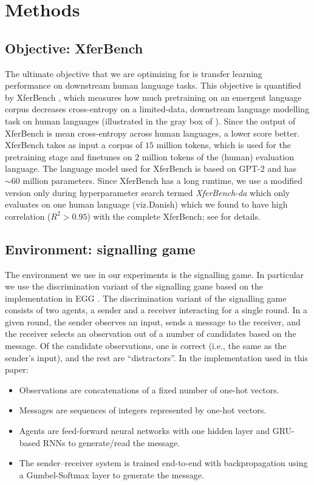 \section{Methods}
\unskip\label{hpo:sec:methods}
\subsection{Objective: XferBench}

The ultimate objective that we are optimizing for is transfer learning performance on downstream human language tasks.
This objective is quantified by XferBench \citep[MIT license]{boldt-mortensen-2024-xferbench}, which measures how much pretraining on an emergent language corpus decreases cross-entropy on a limited-data, downstream language modelling task on human languages (illustrated in the gray box of ).
Since the output of XferBench is mean cross-entropy across human languages, a lower score better.
XferBench takes as input a corpus of $15$ million tokens, which is used for the pretraining stage and finetunes on $2$ million tokens of the (human) evaluation language.
The language model used for XferBench is based on GPT-2 \citep{radford2019language} and has ${\sim}60$ million parameters.
Since XferBench has a long runtime, we use a modified version only during hyperparameter search termed \emph{XferBench-da} which only evaluates on one human language (viz.\@ Danish) which we found to have high correlation ($R^2>0.95$) with the complete XferBench; see  for details.

\subsection{Environment: signalling game}
The environment we use in our experiments is the signalling game.
In particular we use the discrimination variant of the signalling game based on the implementation in EGG \citep[\url{https://github.com/facebookresearch/EGG}, MIT license]{egg}.
The discrimination variant of the signalling game consists of two agents, a sender and a receiver interacting for a single round.
In a given round, the sender observes an input, sends a message  to the receiver, and the receiver selects an observation out of a number of candidates based on the message.
Of the candidate observations, one is correct (i.e., the same as the sender's input), and the rest are ``distractors''.
In the implementation used in this paper:
\begin{itemize}[nosep]
  \item Observations are concatenations of a fixed number of one-hot vectors.
  \item Messages are sequences of integers represented by one-hot vectors.
  \item Agents are feed-forward neural networks with one hidden layer and GRU-based RNNs to generate/read the message.
  \item The sender--receiver system is trained end-to-end with backpropagation using a Gumbel-Softmax layer \citep{maddison2017the,jang2017categorical} to generate the message.
\end{itemize}

